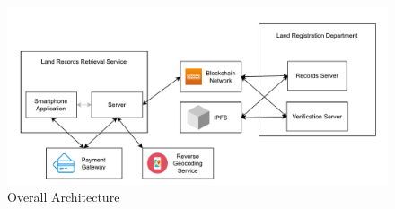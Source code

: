 \documentclass{article}
\begin{document}
    \paragraph{}
    \begin{figure}[htbp]
        \includegraphics[scale=0.25]{hld}
        \centering
        \caption{Overall Architecture}
        \label{fig:hld}
    \end{figure}
\end{document}
